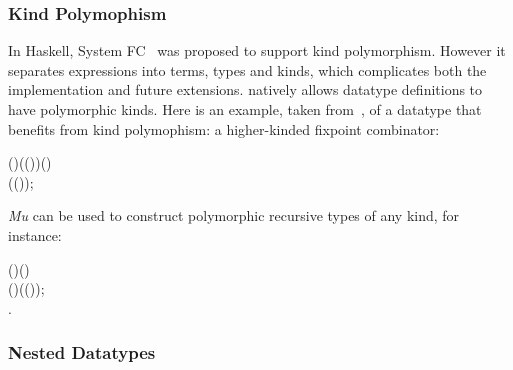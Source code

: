 \subsubsection{Kind Polymophism}
In Haskell, System FC~\cite{fc:pro}  
was proposed to support kind polymorphism. However it separates
expressions into terms, types and kinds, which complicates both the
implementation and future extensions. \sufcc natively allows datatype
definitions to have polymorphic kinds. Here is an example, taken
from~\cite{fc:pro}, of a datatype that benefits from kind polymophism:
a higher-kinded fixpoint combinator:
\begin{hscode}\SaveRestoreHook
{}%
%
%
%
\>[3]{}\;\;(\mathbin{:}\star)\;(\mathbin{:}(\to \star)\to {}\to \star)\;(\mathbin{:})\mathrel{=}{}\<[E]%
\\
\>[3]{}\<[5]%
\>[5]{}\;(\mathbin{:}\;(\;\;)\;);{}\<[E]%
\ColumnHook
\end{hscode}\resethooks
\emph{Mu} can be used to construct polymorphic recursive types of any kind, for instance:
\begin{hscode}\SaveRestoreHook
{}%
%
%
%
\>[3]{}\;\;(\mathbin{:}\star\to \star)\;(\mathbin{:}\star)\mathrel{=}\<[E]%
\\
\>[3]{}\<[5]%
\>[5]{}\mid {}\;(\mathbin{:})\;(\mathbin{:}(\;));{}\<[E]%
\\
\>[3]{}\;\mathbin{:}\star\to \star\mathrel{=}\lambda {}\mathbin{:}\star.\,\star{}\;\<[E]%
\ColumnHook
\end{hscode}\resethooks
\subsubsection{Nested Datatypes}

